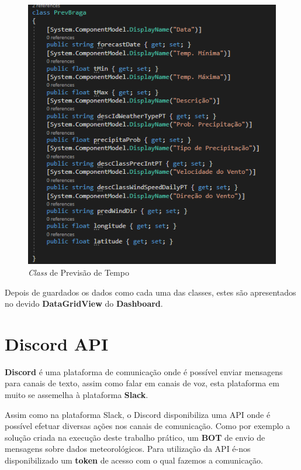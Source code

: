 \begin{figure}[H]
    \centering
    \includegraphics[scale=0.8]{imagens/PrevBragaClass.png}
    \caption{\textit{Class} de Previsão de Tempo}
\end{figure}

Depois de guardados os dados como cada uma das classes, estes são apresentados no devido \textbf{DataGridView} do \textbf{Dashboard}.

\newpage

\section*{Discord API}

\textbf{Discord} é uma plataforma de comunicação onde é possível enviar mensagens para canais de texto, assim como falar em canais de voz, esta plataforma em muito se assemelha à plataforma \textbf{Slack}. 

Assim como na plataforma Slack, o Discord disponibiliza uma API onde é possível efetuar diversas ações nos canais de comunicação. Como por exemplo a solução criada na execução deste trabalho prático, um \textbf{BOT} de envio de mensagens sobre dados meteorológicos. Para utilização da API é-nos disponibilizado um \textbf{token} de acesso com o qual fazemos a comunicação.

